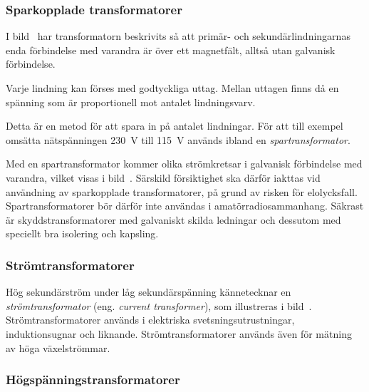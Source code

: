 \subsubsection{Sparkopplade transformatorer}


I bild~ har transformatorn beskrivits så att primär- och
sekundärlindningarnas enda förbindelse med varandra är över ett magnetfält,
alltså utan galvanisk förbindelse.

Varje lindning kan förses med godtyckliga uttag. Mellan uttagen finns 
då en spänning som är proportionell mot antalet lindningsvarv.

Detta är en metod för att spara in på antalet lindningar.
För att till exempel omsätta nätspänningen \qty{230}{\volt} till
\qty{115}{\volt} används ibland en \emph{spartransformator}.

Med en spartransformator kommer olika strömkretsar i galvanisk förbindelse med
varandra, vilket visas i bild~.
Särskild försiktighet ska därför iakttas vid användning av sparkopplade
transformatorer, på grund av risken för elolycksfall.
Spartransformatorer bör därför inte användas i amatörradiosammanhang.
Säkrast är skyddstransformatorer med galvaniskt skilda ledningar och dessutom
med speciellt bra isolering och kapsling.

\subsubsection{Strömtransformatorer}

Hög sekundärström under låg sekundärspänning kännetecknar en
\emph{strömtransformator} (eng. \emph{current transformer}),
som illustreras i bild~.
Strömtransformatorer används i elektriska svetsningsutrustningar,
induktionsugnar och liknande.
Strömtransformatorer används även för mätning av höga växelströmmar.


\subsubsection{Högspänningstransformatorer}

